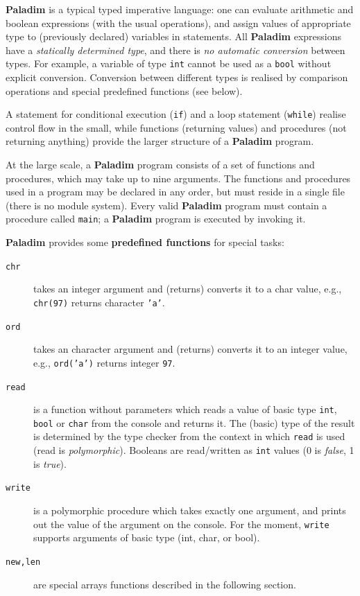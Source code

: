 \documentclass[12pt,a4paper]{article}
\newcommand{\paladim}{\textbf{Paladim}\xspace}
\begin{document}
\paladim is a typical typed imperative language: one can evaluate arithmetic
and boolean expressions (with the usual operations), and assign values
of appropriate type to (previously declared) variables in statements.
All \paladim expressions have a \emph{statically determined type}, and there
is \emph{no automatic conversion} between types. For example, a variable of
type \texttt{int} cannot be used as a \texttt{bool} without explicit
conversion.
Conversion between different types is realised by comparison operations and
special predefined functions (see below).

A statement for conditional execution (\texttt{if}) and a loop statement
(\texttt{while}) realise control flow in the small, while functions
(returning values) and procedures (not returning anything) provide the larger
structure of a \paladim program.

At the large scale, a \paladim program consists of a set of functions and
procedures, which may take up to nine arguments.
%
The functions and procedures used in a program may be declared in any order,
but must reside in a single file (there is no module system).
%
Every valid \paladim program must contain a procedure called \texttt{main};
a \paladim program is executed by invoking it. %

\bigskip
\paladim provides some \textbf{predefined functions} for special tasks:
\begin{description}
\item[\tt chr] takes an integer argument and (returns) converts it to
        a char value, e.g., \texttt{chr(97)} returns character \texttt{'a'}.
\item[\tt ord] takes an character argument and (returns) converts it to an
        integer value, e.g., \texttt{ord('a')} returns integer \texttt{97}.
\item[\tt read] is a function without parameters which reads a value of basic type
                    \texttt{int}, \texttt{bool} or \texttt{char}
                    from the console and returns it. The
                    (basic) type of the result is determined by the type checker
                    from the context in which \texttt{read} is used
                    (read is \emph{polymorphic}).
    Booleans are read/written as \texttt{int} values (0 is \emph{false}, 1 is \emph{true}).

\item[\tt write] is a polymorphic procedure which takes exactly one
    argument, and prints out the value of the argument on the console.
    For the moment, \texttt{write} supports arguments of
        basic type (int, char, or bool).

\item[\tt new,len] are special arrays functions described in the
following section. %

\end{description}
\end{document}
